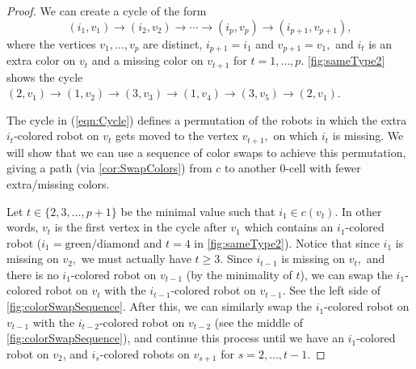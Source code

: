 \documentclass{amsart}
\theoremstyle{definition}
\theoremstyle{remark}
\begin{document}
\begin{proof}
We can create a cycle of the form 
\begin{equation}\label{eqn:Cycle}
    (i_1,v_1)\to(i_2,v_2)\to\cdots\to(i_p,v_p)\to(i_{p+1},v_{p+1}),
\end{equation}
where the vertices $v_1,\dots,v_p$ are distinct, $i_{p+1}=i_1$ and $v_{p+1}=v_1,$ and $i_t$ is an extra color on $v_t$ and a missing color on $v_{t+1}$ for $t=1,\dots,p.$  \cref{fig:sameType2} shows the cycle $(2,v_1)\to (1,v_2)\to(3,v_3)\to(1,v_4)\to(3,v_5)\to(2,v_1).$

The cycle in (\ref{eqn:Cycle}) defines a permutation of the robots in which the extra $i_t$-colored robot on $v_t$  gets moved to the vertex $v_{t+1},$ on which $i_t$ is missing. We will show that we can use a sequence of color swaps to achieve this permutation, giving a path (via \cref{cor:SwapColors}) from $c$ to another 0-cell with fewer extra/missing colors.

Let $t\in\{2,3,\dots,p+1\}$ be the minimal value such that $i_1\in c(v_t)$. In other words, $v_t$ is the first vertex in the cycle after $v_1$ which contains an $i_1$-colored robot ($i_1=\text{green/diamond}$ and $t=4$ in \cref{fig:sameType2}). Notice that since $i_1$ is missing on $v_2,$ we must actually have $t\ge 3.$ Since $i_{t-1}$ is missing on $v_t,$ and there is no $i_1$-colored robot on $v_{t-1}$ (by the minimality of $t$), we can swap the $i_1$-colored robot on $v_t$ with the $i_{t-1}$-colored robot on $v_{t-1}.$ See the left side of \cref{fig:colorSwapSequence}. After this, we can similarly swap the $i_1$-colored robot on $v_{t-1}$ with the $i_{t-2}$-colored robot on $v_{t-2}$ (see the middle of \cref{fig:colorSwapSequence}), and continue this process until we have an $i_1$-colored robot on $v_2$, and $i_s$-colored robots on $v_{s+1}$ for $s=2,\dots,t-1.$


\end{proof}
\end{document}
